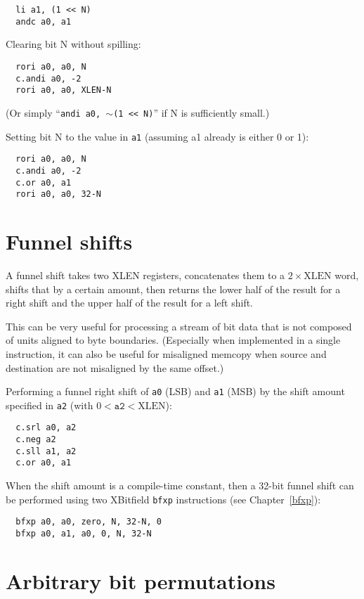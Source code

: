\begin{verbatim}
  li a1, (1 << N)
  andc a0, a1
\end{verbatim}

Clearing bit N without spilling:

\begin{verbatim}
  rori a0, a0, N
  c.andi a0, -2
  rori a0, a0, XLEN-N
\end{verbatim}

(Or simply ``{\tt andi a0, $\sim$(1 << N)}'' if N is sufficiently small.)

Setting bit N to the value in {\tt a1} (assuming a1 already is either 0 or 1):

\begin{verbatim}
  rori a0, a0, N
  c.andi a0, -2
  c.or a0, a1
  rori a0, a0, 32-N
\end{verbatim}

\section{Funnel shifts}
\label{funnel}

A funnel shift takes two XLEN registers, concatenates them to a $2 \times \textrm{XLEN}$ word,
shifts that by a certain amount, then returns the lower half of the result
for a right shift and the upper half of the result for a left shift.

This can be very useful for processing a stream of bit data that is not
composed of units aligned to byte boundaries. (Especially when implemented
in a single instruction, it can also be useful for misaligned memcopy when
source and destination are not misaligned by the same offset.)

Performing a funnel right shift of {\tt a0} (LSB) and {\tt a1} (MSB) by the
shift amount specified in {\tt a2} (with $0 < \texttt{a2} < \textrm{XLEN}$):

\begin{verbatim}
  c.srl a0, a2
  c.neg a2
  c.sll a1, a2
  c.or a0, a1
\end{verbatim}

When the shift amount is a compile-time constant, then a 32-bit funnel shift can be
performed using two XBitfield {\tt bfxp} instructions (see Chapter~\ref{bfxp}):

\begin{verbatim}
  bfxp a0, a0, zero, N, 32-N, 0
  bfxp a0, a1, a0, 0, N, 32-N
\end{verbatim}

\section{Arbitrary bit permutations}


